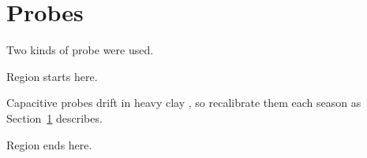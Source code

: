 \documentclass[11pt]{article}
\begin{document}
\section{Probes}\label{sec:probes}
Two kinds of probe were used.

Region starts here.

\begin{framed}
Capacitive probes drift in heavy clay \parencite{Nguyen2024}, so recalibrate them each season as Section~\ref{sec:probes} describes.
\end{framed}

Region ends here.

\printbibliography
\end{document}

